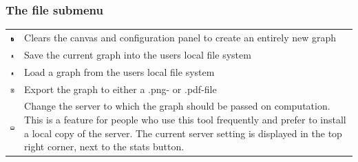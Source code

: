 \subsubsection{The file submenu}
\begin{tabular}{p{}p{}}
\includegraphics[scale=0.6]{figures/icons/new.png} & Clears the canvas and configuration panel to create an entirely new graph\\
\includegraphics[scale=0.6]{figures/icons/download.png}& Save the current graph into the users local file system\\
\includegraphics[scale=0.6]{figures/icons/upload.png}& Load a graph from the users local file system\\
\includegraphics[scale=0.6]{figures/icons/export.png}& Export the graph to either a .png- or .pdf-file\\
\includegraphics[scale=0.6]{figures/icons/server.png} &Change the server to which the graph should be passed on computation. This is a feature for people who use this tool frequently and prefer to install a local copy of the server. The current server setting is displayed in the top right corner, next to the stats button. 
\end{tabular}
